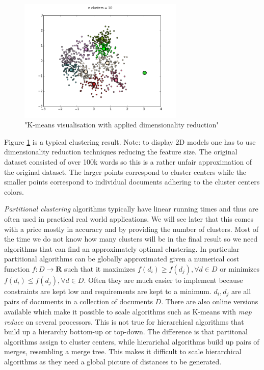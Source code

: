     \begin{figure}[h!]
      \centering
        \includegraphics[width=0.7\textwidth]{kmeans_clustering.png}
        \caption{"K-means visualisation with applied dimensionality reduction"}
        \label{kmeans_clustering}
    \end{figure}

    Figure \ref{kmeans_clustering} is a typical clustering result. Note: to display 2D models one has to use dimensionality reduction techniques reducing the feature size. The original dataset consisted of over 100k words so this is a rather unfair approximation of the original dataset. The larger points correspond to cluster centers while the smaller points correspond to individual documents adhering to the cluster centers colors. 

    \emph{Partitional clustering} algorithms typically have linear running times and thus are often used in practical real world applications. We will see later that this comes with a price mostly in accuracy and by providing the number of clusters. Most of the time we do not know how many clusters will be in the final result so we need algorithms that can find an approximately optimal clustering. In particular partitional algorithms can be globally approximated given a numerical cost function $f:D \to \mathbf{R}$ such that it maximizes $f(d_i) \geq f(d_j), \forall d \in D$  or minimizes $f(d_i) \leq f(d_j), \forall d \in D$. Often they are much easier to implement because constraints are kept low and requirements are kept to a minimum. $d_i,d_j$ are all pairs of documents in a collection of documents $D$. There are also online versions available which make it possible to scale algorithms such as K-means with \emph{map reduce} on several processors. This is not true for hierarchical algorithms that build up a hierarchy bottom-up or top-down. The difference is that partitonal algorithms assign to cluster centers, while hierarichal algorithms build up pairs of merges, resembling a merge tree. This makes it difficult to scale hierarchical algorithms as they need a global picture of distances to be generated.

